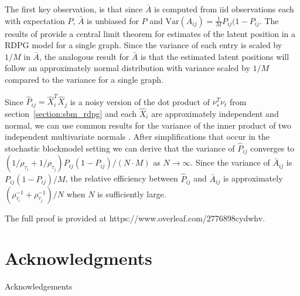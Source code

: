 \documentclass[10pt,letterpaper]{article}
\begin{document}
The first key observation, is that since $\bar{A}$ is computed from iid observations each with expectation $P$, $\bar{A}$ is unbiased for $P$ and $\mathrm{Var}(A_{ij}) = \frac{1}{M}P_{ij}(1-P_{ij}$.
The results of \citet{athreya2013limit} provide a central limit theorem for estimates of the latent position in a RDPG model for a single graph.
Since the variance of each entry is scaled by $1/M$ in $\bar{A}$, the analogous result for $\bar{A}$ is that the estimated latent positions will follow an approximately normal distribution with variance scaled by $1/M$ compared to the variance for a single graph. 
    


Since $\hat{P}_{ij} = \hat{X}_i^T \hat{X}_j$ is a noisy version of the dot product of $\nu_s^T \nu_t$ from section~\ref{section:sbm_rdpg} and each $\hat{X}_i$ are approximately independent and normal, we can use common results for the variance of the inner product of two independent multivariate normals \citet{brown1977means}.
After simplifications that occur in the stochastic blockmodel setting we can derive that the variance of $\hat{P}_{ij}$ converges to $\left( 1/\rho_{\tau_i} + 1/\rho_{\tau_j} \right) P_{ij} (1-P_{ij})/(N \cdot M)$ as $N \rightarrow \infty$. 
Since the variance of $\bar{A}_{ij}$ is $P_{ij} (1-P_{ij})/M$, the relative efficiency between $\hat{P}_{ij}$ and $\bar{A}_{ij}$ is approximately $(\rho_{\tau_i}^{-1} + \rho_{\tau_j}^{-1})/N$ when $N$ is sufficiently large.
    
The full proof is provided at https://www.overleaf.com/2776898cydwhv. 


\section*{Acknowledgments}
{\color{red} Acknowledgements}

\nolinenumbers
\end{document}
